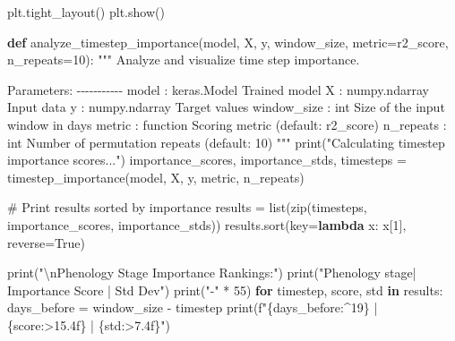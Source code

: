 \documentclass[
  letterpaper,
  DIV=11,
  numbers=noendperiod]{scrreprt}
\newenvironment{Shaded}{\begin{snugshade}}{\end{snugshade}}
\newcommand{\BuiltInTok}[1]{\textcolor[rgb]{0.00,0.23,0.31}{#1}}
\newcommand{\CharTok}[1]{\textcolor[rgb]{0.13,0.47,0.30}{#1}}
\newcommand{\CommentTok}[1]{\textcolor[rgb]{0.37,0.37,0.37}{#1}}
\newcommand{\ControlFlowTok}[1]{\textcolor[rgb]{0.00,0.23,0.31}{\textbf{#1}}}
\newcommand{\DecValTok}[1]{\textcolor[rgb]{0.68,0.00,0.00}{#1}}
\newcommand{\KeywordTok}[1]{\textcolor[rgb]{0.00,0.23,0.31}{\textbf{#1}}}
\newcommand{\NormalTok}[1]{\textcolor[rgb]{0.00,0.23,0.31}{#1}}
\newcommand{\OperatorTok}[1]{\textcolor[rgb]{0.37,0.37,0.37}{#1}}
\newcommand{\SpecialCharTok}[1]{\textcolor[rgb]{0.37,0.37,0.37}{#1}}
\newcommand{\SpecialStringTok}[1]{\textcolor[rgb]{0.13,0.47,0.30}{#1}}
\newcommand{\StringTok}[1]{\textcolor[rgb]{0.13,0.47,0.30}{#1}}
\newcommand{\VariableTok}[1]{\textcolor[rgb]{0.07,0.07,0.07}{#1}}
\begin{document}
\begin{Shaded}
\begin{Highlighting}[]
\NormalTok{    plt.tight\_layout()}
\NormalTok{    plt.show()}

\KeywordTok{def}\NormalTok{ analyze\_timestep\_importance(model, X, y, window\_size, metric}\OperatorTok{=}\NormalTok{r2\_score, n\_repeats}\OperatorTok{=}\DecValTok{10}\NormalTok{):}
    \CommentTok{"""}
\CommentTok{    Analyze and visualize time step importance.}

\CommentTok{    Parameters:}
\CommentTok{    {-}{-}{-}{-}{-}{-}{-}{-}{-}{-}{-}}
\CommentTok{    model : keras.Model}
\CommentTok{        Trained model}
\CommentTok{    X : numpy.ndarray}
\CommentTok{        Input data}
\CommentTok{    y : numpy.ndarray}
\CommentTok{        Target values}
\CommentTok{    window\_size : int}
\CommentTok{        Size of the input window in days}
\CommentTok{    metric : function}
\CommentTok{        Scoring metric (default: r2\_score)}
\CommentTok{    n\_repeats : int}
\CommentTok{        Number of permutation repeats (default: 10)}
\CommentTok{    """}
    \BuiltInTok{print}\NormalTok{(}\StringTok{"Calculating timestep importance scores..."}\NormalTok{)}
\NormalTok{    importance\_scores, importance\_stds, timesteps }\OperatorTok{=}\NormalTok{ timestep\_importance(model, X, y, metric, n\_repeats)}

    \CommentTok{\# Print results sorted by importance}
\NormalTok{    results }\OperatorTok{=} \BuiltInTok{list}\NormalTok{(}\BuiltInTok{zip}\NormalTok{(timesteps, importance\_scores, importance\_stds))}
\NormalTok{    results.sort(key}\OperatorTok{=}\KeywordTok{lambda}\NormalTok{ x: x[}\DecValTok{1}\NormalTok{], reverse}\OperatorTok{=}\VariableTok{True}\NormalTok{)}

    \BuiltInTok{print}\NormalTok{(}\StringTok{"}\CharTok{\textbackslash{}n}\StringTok{Phenology Stage Importance Rankings:"}\NormalTok{)}
    \BuiltInTok{print}\NormalTok{(}\StringTok{"Phenology stage| Importance Score | Std Dev"}\NormalTok{)}
    \BuiltInTok{print}\NormalTok{(}\StringTok{"{-}"} \OperatorTok{*} \DecValTok{55}\NormalTok{)}
    \ControlFlowTok{for}\NormalTok{ timestep, score, std }\KeywordTok{in}\NormalTok{ results:}
\NormalTok{        days\_before }\OperatorTok{=}\NormalTok{ window\_size }\OperatorTok{{-}}\NormalTok{ timestep}
        \BuiltInTok{print}\NormalTok{(}\SpecialStringTok{f"}\SpecialCharTok{\{}\NormalTok{days\_before}\SpecialCharTok{:\^{}19\}}\SpecialStringTok{ | }\SpecialCharTok{\{}\NormalTok{score}\SpecialCharTok{:\textgreater{}15.4f\}}\SpecialStringTok{ | }\SpecialCharTok{\{}\NormalTok{std}\SpecialCharTok{:\textgreater{}7.4f\}}\SpecialStringTok{"}\NormalTok{)}


\end{Highlighting}
\end{Shaded}
\end{document}
